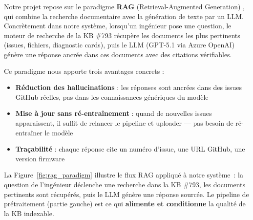 \documentclass[12pt,a4paper]{report}
\begin{document}
Notre projet repose sur le paradigme \textbf{RAG} (Retrieval-Augmented Generation) \cite{lewis2020rag}, qui combine la recherche documentaire avec la génération de texte par un LLM. Concrètement dans notre système, lorsqu'un ingénieur pose une question, le moteur de recherche de la KB \#793 récupère les documents les plus pertinents (issues, fichiers, diagnostic cards), puis le LLM (GPT-5.1 via Azure OpenAI) génère une réponse ancrée dans ces documents avec des citations vérifiables.

Ce paradigme nous apporte trois avantages concrets :
\begin{itemize}
  \item \textbf{Réduction des hallucinations} : les réponses sont ancrées dans des issues GitHub réelles, pas dans les connaissances génériques du modèle
  \item \textbf{Mise à jour sans ré-entraînement} : quand de nouvelles issues apparaissent, il suffit de relancer le pipeline et uploader --- pas besoin de ré-entraîner le modèle
  \item \textbf{Traçabilité} : chaque réponse cite un numéro d'issue, une URL GitHub, une version firmware
\end{itemize}

La Figure~\ref{fig:rag_paradigm} illustre le flux RAG appliqué à notre système~: la question de l'ingénieur déclenche une recherche dans la KB \#793, les documents pertinents sont récupérés, puis le LLM génère une réponse sourcée. Le pipeline de prétraitement (partie gauche) est ce qui \textbf{alimente et conditionne} la qualité de la KB indexable.
\end{document}
